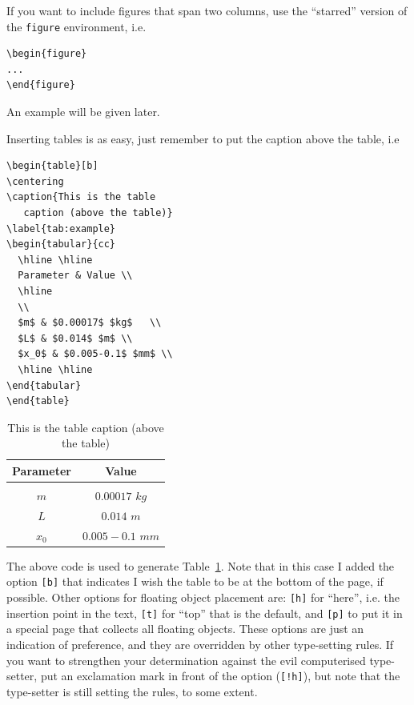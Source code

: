 \documentclass[a4paper,twoside,10pt]{fonetik}
\begin{document}
If you want to include figures that span two columns, use the
``starred'' version of the {\tt figure} environment, i.e.
\begin{verbatim}
\begin{figure}
...
\end{figure}
\end{verbatim}
An example will be given later.

Inserting tables is as easy, just remember to put the caption above the
table, i.e
\begin{verbatim}
\begin{table}[b]
\centering
\caption{This is the table
   caption (above the table)}
\label{tab:example}
\begin{tabular}{cc}
  \hline \hline
  Parameter & Value \\
  \hline
  \\
  $m$ & $0.00017$ $kg$   \\
  $L$ & $0.014$ $m$ \\
  $x_0$ & $0.005-0.1$ $mm$ \\
  \hline \hline
\end{tabular}
\end{table}
\end{verbatim}

\begin{table}[b]
\centering
\caption{This is the table caption
  (above the table)}
\label{tab:example}
\begin{tabular}{cc}
  \hline \hline
     Parameter & Value \\
     \hline
     \\
      $m$ & $0.00017$ $kg$   \\
      $L$ & $0.014$ $m$ \\
      $x_0$ & $0.005-0.1$ $mm$ \\
      \hline \hline
\end{tabular}
\end{table}

The above code is used to generate Table~\ref{tab:example}. Note that in this
case I added the option {\tt [b]} that indicates I wish the table to
be at the bottom of the page, if possible. Other options for floating
object placement are: {\tt [h]} for ``here'', i.e. the insertion point
in the text, {\tt [t]} for ``top'' that is the default, and {\tt [p]}
to put it in a special page that collects all floating objects. These
options are just an indication of preference, and they are overridden
by other type-setting rules. If you want to strengthen your
determination against the evil computerised type-setter, put an
exclamation mark in front of the option (\verb|[!h]|), but note that
the type-setter is still setting the rules, to some extent.
\end{document}
